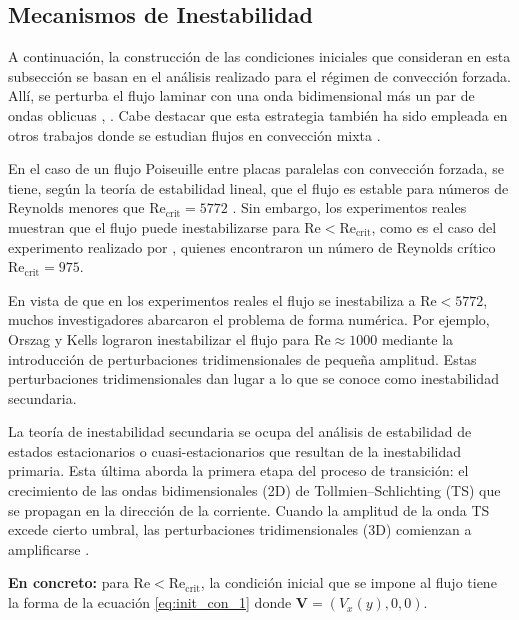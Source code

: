 \subsection{Mecanismos de Inestabilidad} \label{sec:mecanismo}

A continuación, la construcción de las condiciones iniciales que consideran en esta subsección se basan en el análisis realizado para el régimen de convección forzada. Allí, se perturba el flujo laminar con una onda bidimensional más un par de ondas oblicuas \cite{machaca2024}, \cite{schmid}. Cabe destacar que esta estrategia también ha sido empleada en otros trabajos donde se estudian flujos en convección mixta \cite{chen2003direct}.  

En el caso de un flujo Poiseuille entre placas paralelas con convección forzada, se tiene, según la teoría de estabilidad lineal, que el flujo es estable para números de Reynolds menores que $\text{Re}_{\text{crit}}=5772$ \cite{orszag1971accurate}. Sin embargo, los experimentos reales muestran que el flujo puede inestabilizarse para $\text{Re} < \text{Re}_{\text{crit}}$, como es el caso del experimento realizado por \cite{kao1970experimental}, quienes encontraron un número de Reynolds crítico $\text{Re}_{\text{crit}}= 975$. 

En vista de que en los experimentos reales el flujo se inestabiliza a $\text{Re} < 5772$, muchos investigadores abarcaron el problema  de forma numérica. Por ejemplo, Orszag y Kells \cite{orszag1980transition} lograron inestabilizar el flujo para  $\text{Re} \approx 1000$ mediante la introducción de perturbaciones tridimensionales de pequeña amplitud. Estas perturbaciones tridimensionales dan lugar a lo que se conoce como inestabilidad secundaria.

La teoría de inestabilidad secundaria se ocupa del análisis de estabilidad de estados estacionarios o cuasi-estacionarios que resultan de la inestabilidad primaria. Esta última aborda la primera etapa del proceso de transición: el crecimiento de las ondas bidimensionales (2D) de Tollmien–Schlichting (TS) \cite{tollmien1935, schlichting1933} que se propagan en la dirección de la corriente. Cuando la amplitud de la onda TS excede cierto umbral, las perturbaciones tridimensionales (3D) comienzan a amplificarse \cite{schmid}. 

\textbf{En concreto:} para $\text{Re} < \text{Re}_{\text{crit}}$, la condición inicial que se impone al flujo tiene la forma de la ecuación \ref{eq:init_con_1} donde $\mathbf{V}=(V_x(y),0,0)$.

